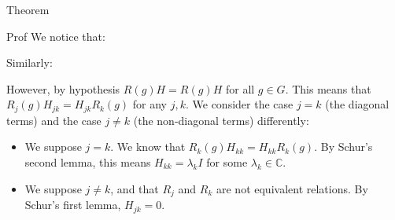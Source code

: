 \documentclass[a4paper]{article}
\begin{document}
\begin{parag}{Theorem}
    \begin{subparag}{Prof}
        We notice that:

        Similarly:

        However, by hypothesis $R\left(g\right) H = R\left(g\right) H$ for all $g \in G$. This means that $R_j\left(g\right) H_{jk} = H_{jk} R_k\left(g\right)$ for any $j, k$. We consider the case $j = k$ (the diagonal terms) and the case $j \neq k$ (the non-diagonal terms) differently:
        \begin{itemize}[left=0pt]
            \item We suppose $j = k$. We know that $R_k\left(g\right) H_{kk} = H_{kk} R_k\left(g\right)$. By Schur's second lemma, this means $H_{kk} = \lambda_k I$ for some $\lambda_k \in \mathbb{C}$.
            \item We suppose $j \neq k$, and that $R_j$ and $R_k$ are not equivalent relations. By Schur's first lemma, $H_{jk} = 0$.
        \end{itemize}


\end{subparag}
\end{parag}
\end{document}
